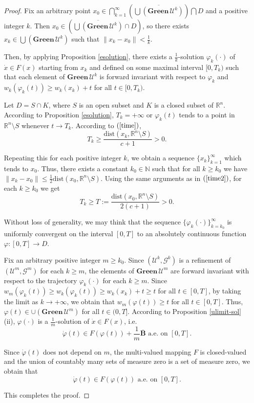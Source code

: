 \documentclass[a4paper]{article}
\begin{document}
\begin{proof}
    Fix an arbitrary point $x_0 \in \bigcap_{k=1}^{\infty}\left(\overline{\bigcup(\mathbf{Green} \,\mathcal{U}^k)}\right) \bigcap D$ and a positive integer $k$. Then $x_0 \in \left(\overline{\bigcup(\mathbf{Green} \,\mathcal{U}^k)} \cap D\right)$, so there exists $x_k \in \bigcup(\mathbf{Green} \,\mathcal{U}^k)$ such that $\|x_k-x_0\| < \frac{1}{k}$.

    Then, by applying Proposition \ref{esolution}, there exists a $\frac{1}{k}$-solution $\varphi_k(\cdot)$ of $\dot{x} \in F(x)$ starting from $x_k$ and defined on some maximal interval $[0,T_k)$ such that each element of $\mathbf{Green} \,\mathcal{U}^k$ is forward invariant with respect to $\varphi_k$ and $w_k(\varphi_k(t)) \ge w_k(x_k) + t$ for all $t \in [0,T_k)$.

    Let $D = S \cap K$, where $S$ is an open subset and $K$ is a closed subset of $\mathbb{R}^n$. According to Proposition \ref{esolution}, $T_k = +\infty$ or $\varphi_k(t)$ tends to a point in $\mathbb{R}^n \setminus S$ whenever $t \to T_k$. According to $(\ref{time})$, $$T_k \ge \frac{\mathrm{dist}(x_k,\mathbb{R}^n \setminus S)}{c+1} > 0.$$

    Repeating this for each positive integer $k$, we obtain a sequence $\{x_k\}_{k=1}^{\infty}$ which tends to $x_0$. Thus, there exists a constant $k_0 \in \mathbb{N}$ such that for all $k \ge k_0$ we have $\|x_k-x_0\| \le \frac{1}{2} \mathrm{dist}(x_0,\mathbb{R}^n \setminus S)$. Using the same arguments as in $(\ref{time2})$, for each $k \ge k_0$ we get $$T_k \ge T:= \frac{\mathrm{dist}(x_0,\mathbb{R}^n \setminus S)}{2(c+1)} > 0.$$

    Without loss of generality, we may think that the sequence $\{\varphi_k(\cdot)\}_{k=k_0}^{\infty}$ is uniformly convergent on the interval $[0,T]$ to an absolutely continuous function $\varphi : [0,T] \to D$.

    Fix an arbitrary positive integer $m \ge k_0$. Since $(\mathcal{U}^k,\mathcal{G}^k)$ is a refinement of $(\mathcal{U}^m,\mathcal{G}^m)$ for each $k \ge m$, the elements of $\mathbf{Green} \,\mathcal{U}^m$ are forward invariant with respect to the trajectory $\varphi_k(\cdot)$ for each $k \ge m$. Since $w_m(\varphi_k(t)) \ge w_k(\varphi_k(t)) \ge w_k(x_k) + t \ge t$ for all $t \in [0,T]$, by taking the limit as $k \to +\infty$, we obtain that $w_m(\varphi(t)) \ge t$ for all $t \in [0,T]$. Thus, $\varphi(t) \in \cup(\mathbf{Green} \,\mathcal{U}^m)$ for all $t \in (0,T]$. According to Proposition \ref{ulimit-sol}(ii), $\varphi(\cdot)$ is a $\frac{1}{m}$-solution of $\dot{x} \in F(x)$, i.e. $$\dot{\varphi}(t) \in F(\varphi(t)) + \frac{1}{m} \overline{\mathbf{B}} \text{ a.e. on } [0,T].$$

    Since $\dot{\varphi}(t)$ does not depend on $m$, the multi-valued mapping $F$ is closed-valued and the union of countably many sets of measure zero is a set of measure zero, we obtain that $$\dot{\varphi}(t) \in F(\varphi(t)) \text{ a.e. on } [0,T].$$

    This completes the proof.
\end{proof}
\end{document}
